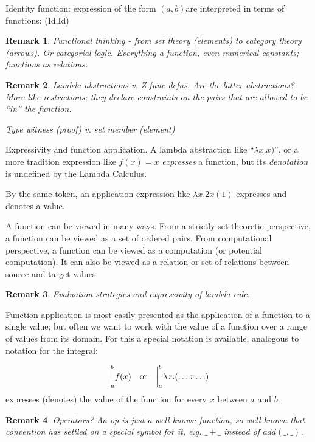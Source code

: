 \documentclass[12pt]{tufte-handout}
\numberwithin{equation}{subsection}
\numberwithin{equation}{subsection}
\newtheorem{remark}{Remark}
\newcommand\ab{\((a,b)\)}
\begin{document}
  Identity function: expression of the form \ab are interpreted in terms
  of functions: (Id,Id)

  \begin{remark}
    Functional thinking - from set theory (elements) to category theory
    (arrows).  Or categorial logic.  Everything a function, even
    numerical constants; functions as relations.
  \end{remark}

  \begin{remark}
    Lambda abstractions v. Z func defns.  Are the latter abstractions?
    More like restrictions; they declare constraints on the pairs that
    are allowed to be ``in'' the function.

    Type witness (proof) v. set member (element)
  \end{remark}

  Expressivity and function application.  A lambda abstraction like
  ``\(\lambda x.x)\)'', or a more tradition expression like \(f(x) = x\)
  \textit{expresses} a function, but its \textit{denotation} is
  undefined by the Lambda Calculus.

  By the same token, an application expression like \(\lambda x.2x(1)\)
  expresses and denotes a value.

  A function can be viewed in many ways.  From a strictly set-theoretic
  perspective, a function can be viewed as a set of ordered pairs.  From
  computational perspective, a function can be viewed as a computation
  (or potential computation).  It can also be viewed as a relation or
  set of relations between source and target values.

  \begin{remark}
    Evaluation strategies and expressivity of lambda calc.
  \end{remark}

  Function application is most easily presented as the application of a
  function to a single value; but often we want to work with the value
  of a function over a range of values from its domain.  For this a
  special notation is available, analogous to notation for the integral:

  \[\bigg|_a^b f(x) \quad\textnormal{or}\quad\bigg|_a^b \lambda x.(\ldots x\ldots)\]
  \noindent expresses (denotes) the value of the function for every \(x\) between \(a\) and \(b\).

  \begin{remark}
    Operators?  An op is just a well-known function, so well-known that
    convention has settled on a special symbol for it, e.g. \(\_+\_\)
    instead of \(add(\_,\_)\).
  \end{remark}
\end{document}
